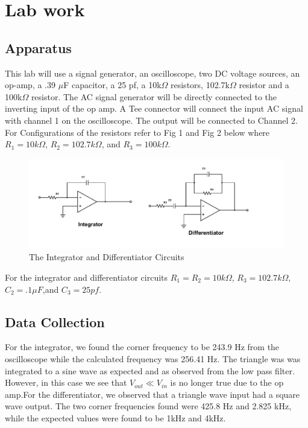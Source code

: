 \documentclass[11pt,letterpaper,onecolumn]{article}
\begin{document}
\section{Lab work}

\subsection{Apparatus}


This lab will use a signal generator, an oscilloscope, two DC voltage sources, an op-amp, a .39 $\mu$F capacitor, a 25 pf, a 10k$\Omega$ resistors, 102.7k$\Omega$ resistor and a 100k$\Omega$ resistor. The AC signal generator will be directly connected to the inverting input of the op amp. A Tee connector will connect the input AC signal with channel 1 on the oscilloscope. The output will be connected to Channel 2. For Configurations of the resistors refer to Fig 1 and Fig 2 below where $R_1 = 10k\Omega$, $R_2 = 102.7k\Omega$, and $R_3 = 100k\Omega$.

\begin{figure}[H]
    \centering
    \includegraphics[scale = .8]{lab10IntDif.pdf}
    \caption{The Integrator and Differentiator Circuits}
    \label{fig:my_label}
\end{figure} 

For the integrator and differentiator circuits $R_1 = R_2 = 10k\Omega$, $ R_3 = 102.7k\Omega$, $C_2 = .1\mu F$,and $C_3 = 25pf$.

\subsection{Data Collection}

For the integrator, we found the corner frequency to be 243.9 Hz from the oscilloscope while the calculated frequency was 256.41 Hz. The triangle was was integrated to a sine wave as expected and as observed from the low pass filter. However, in this case we see that $V_{out} \ll V_{in}$ is no longer true due to the op amp.For the differentiator, we observed that a triangle wave input had a square wave output. The two corner frequencies found were 425.8 Hz and 2.825 kHz, while the expected values were found to be 1kHz and 4kHz. 
\end{document}
